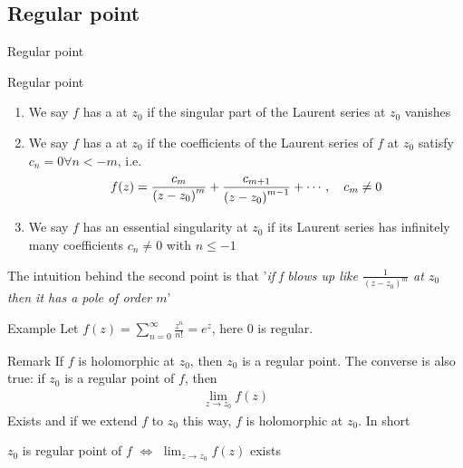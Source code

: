 \subsection{Regular point}

\begin{parag}{Regular point}
	\begin{definition}{Regular point}
		$ $\\

		\begin{enumerate}
			\item We say $f$ has a  at $z_0$ if the singular part of the Laurent series at $z_0$ vanishes
			\item We say $f$ has a  at $z_0$ if the coefficients of the Laurent series of $f$ at $z_0$ satisfy $c_n = 0 \forall n < -m$, i.e.
				\begin{align*} 
					f\left(z\right) = \frac{c_m}{\left(z - z_0\right)^{m}} + \frac{c_{m + 1}}{\left(z - z_0\right)^{m - 1}} + \cdots,  \mathspace c_{m} \neq 0
				\end{align*}
			\item We say $f$ has an essential singularity at $z_0$ if its Laurent series has infinitely many coefficients $c_n \neq 0$ with $n \leq -1$
		\end{enumerate}
    \end{definition}
	The intuition behind the second point is that '\textit{if f blows up like $\frac{1}{\left(z - z_0\right)^{m}}$ at $z_0$ then it has a pole of order $m$}' 
	\begin{subparag}{Example}
	    Let $f\left(z\right) = \sum_{n= 0}^{\infty}\frac{z^{n}}{n!} =  e^{z}$, here $0$ is regular.
	\end{subparag}
	\begin{subparag}{Remark}
	    If $f$ is holomorphic at $z_0$, then $z_0$ is a regular point. The converse is also true: if $z_0$ is a regular point of $f$, then 
		\begin{align*} 
			\lim_{z \to z_0} f\left(z\right)
		\end{align*}
		Exists and if we extend $f$ to $z_0$ this way, $f$ is holomorphic at $z_{0}$. In short
		\begin{center}
		    $z_0$ is regular point of $f$ $\iff$ $\lim_{z \to z_0} f\left(z\right)$ exists
		\end{center}
		

\end{subparag}
\end{parag}
